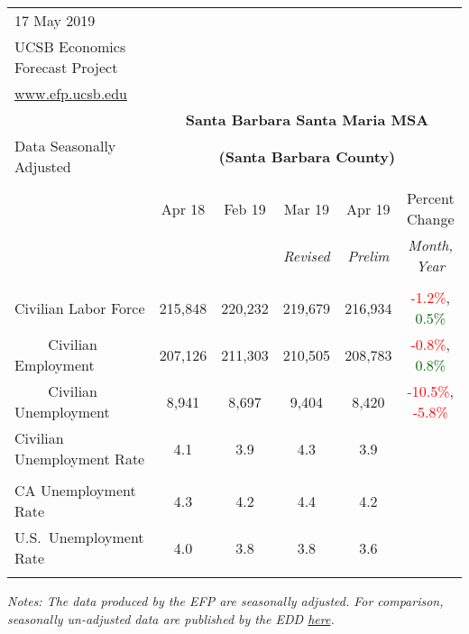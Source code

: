 \documentclass[12pt]{article}
\begin{document}
\begin{table}
\begin{tabular}{|l|c|c|c|c|c|}
\multicolumn{1}{l}{\small 17 May 2019} & \multicolumn{5}{c}{} \\
\multicolumn{1}{l}{\small UCSB Economics Forecast Project} & \multicolumn{5}{c}{} \\
\multicolumn{1}{l}{\small \href{http://www.efp.ucsb.edu/}{www.efp.ucsb.edu}} & \multicolumn{5}{c}{} \\
\multicolumn{1}{c}{} & \multicolumn{5}{c}{\large \textbf{Santa Barbara Santa Maria MSA}} \\
\multicolumn{1}{l}{\small Data Seasonally Adjusted} & \multicolumn{5}{c}{\small \textbf{(Santa Barbara County)}} \\ \hline \hline
& & & & & \\
 & Apr 18 & Feb 19 & Mar 19 & Apr 19 & Percent Change \\
 & & & \small \textit{Revised} & \small \textit{Prelim} & \small \textit{Month, Year} \\ \hline
& & & & & \\
Civilian Labor Force & 215,848 & 220,232 & 219,679 & 216,934 & \textcolor{red}{-1.2\%}, \textcolor{darkgreen}{0.5\%} \\
$\qquad$ \small Civilian Employment & 207,126 & 211,303 & 210,505 & 208,783 & \textcolor{red}{-0.8\%}, \textcolor{darkgreen}{0.8\%} \\
$\qquad$ \small Civilian Unemployment & 8,941 & 8,697 & 9,404 & 8,420 & \textcolor{red}{-10.5\%}, \textcolor{red}{-5.8\%} \\
Civilian Unemployment Rate & 4.1 & 3.9 & 4.3 & 3.9 & \\
& & & & & \\
CA Unemployment Rate & 4.3 & 4.2 & 4.4 & 4.2 & \\
U.S.\ Unemployment Rate & 4.0 & 3.8 & 3.8 & 3.6 & \\
& & & & & \\ \hline \hline
\end{tabular}
\par
\vspace{.5em}
\footnotesize
\textit{Notes: The data produced by the EFP are seasonally adjusted. For comparison, seasonally un-adjusted data are published by the EDD \href{http://www.labormarketinfo.ca.gov/file/lfmonth/satb$pds.pdf}{here}.}
\end{table}
\end{document}
